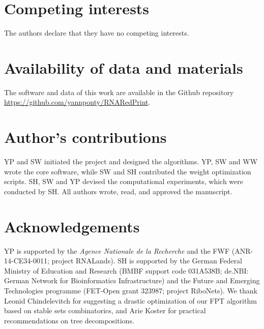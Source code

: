 \documentclass[]{bmcart}
\begin{document}

\begin{backmatter}

\section*{Competing interests}
  The authors declare that they have no competing interests.


\section*{Availability of data and materials}
The software and data of this work are available in the Github repository \url{https://github.com/yannponty/RNARedPrint}.

\section*{Author's contributions}
  YP and SW initiated the project and designed the algorithms.
  YP, SW and WW wrote the core software, while SW and SH contributed the weight optimization scripts. SH, SW and YP devised the computational experiments, which were conducted by SH. All authors wrote, read, and approved the manuscript.

\section*{Acknowledgements}
YP is supported
by the
{\em Agence
  Nationale de la Recherche} and the
FWF (ANR-14-CE34-0011; project RNALands).  SH is supported by the
German Federal Ministry of Education and Research (BMBF support code
031A538B; de.NBI: German Network for Bioinformatics Infrastructure)
and the
Future and Emerging Technologies programme
(FET-Open grant 323987; project RiboNets).
%
We thank Leonid Chindelevitch for suggesting a drastic optimization of our FPT algorithm based on stable sets combinatorics, and Arie Koster for practical recommendations on tree decompositions.


\end{backmatter}
\end{document}
